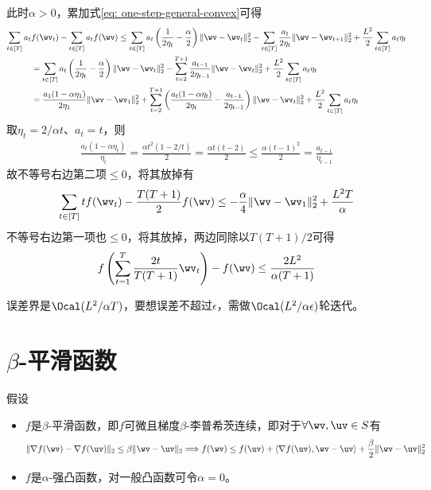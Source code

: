 \documentclass{ctexart}
\begin{document}
此时$\alpha > 0$，累加式\eqref{eq: one-step-general-convex}可得
\begin{align*}
    \sum_{t \in [T]} a_t
     & f(\wv_t) - \sum_{t \in [T]} a_t f(\wv) \le \sum_{t \in [T]} a_t \left( \frac{1}{2\eta_t} - \frac{\alpha}{2} \right) \| \wv - \wv_t \|_2^2 - \sum_{t \in [T]} \frac{a_t}{2\eta_t} \| \wv - \wv_{t+1} \|_2^2 + \frac{L^2}{2} \sum_{t \in [T]} a_t \eta_t \\
     & = \sum_{t \in [T]} a_t \left( \frac{1}{2\eta_t} - \frac{\alpha}{2} \right) \| \wv - \wv_t \|_2^2 - \sum_{t=2}^{T+1} \frac{a_{t-1}}{2\eta_{t-1}} \| \wv - \wv_t \|_2^2 + \frac{L^2}{2} \sum_{t \in [T]} a_t \eta_t                                      \\
     & = \frac{a_1(1 - \alpha \eta_1)}{2 \eta_1} \| \wv - \wv_1 \|_2^2 + \sum_{t=2}^{T+1} \left( \frac{a_t (1 - \alpha \eta_t)}{2 \eta_t} - \frac{a_{t-1}}{2\eta_{t-1}} \right) \| \wv - \wv_t \|_2^2 + \frac{L^2}{2} \sum_{t \in [T]} a_t \eta_t
\end{align*}
取$\eta_t = 2/\alpha t$、$a_t = t$，则
\begin{align*}
    \frac{a_t (1 - \alpha \eta_t)}{\eta_t} = \frac{\alpha t^2 (1 - 2/t)}{2} = \frac{\alpha t (t - 2)}{2} \le \frac{\alpha (t - 1)^2}{2} = \frac{a_{t-1}}{\eta_{t-1}}
\end{align*}
故不等号右边第二项$\le 0$，将其放掉有
\begin{align*}
    \sum_{t \in [T]} t f(\wv_t) - \frac{T(T+1)}{2} f(\wv) \le - \frac{\alpha}{4} \| \wv - \wv_1 \|_2^2 + \frac{L^2 T}{\alpha}
\end{align*}
不等号右边第一项也$\le 0$，将其放掉，两边同除以$T(T+1)/2$可得
\begin{align*}
    f \left( \sum_{t=1}^T \frac{2t}{T(T+1)} \wv_t \right) - f(\wv) \le \frac{2 L^2}{\alpha (T+1)}
\end{align*}

\begin{remark}
    误差界是$\Ocal(L^2/\alpha T)$，要想误差不超过$\epsilon$，需做$\Ocal(L^2/\alpha \epsilon)$轮迭代。
\end{remark}

\section{$\beta$-平滑函数}

假设
\begin{itemize}
    \item $f$是$\beta$-平滑函数，即$f$可微且梯度$\beta$-李普希茨连续，即对于$\forall \wv, \uv \in S$有
          \begin{align*}
              \| \nabla f(\wv) - \nabla f(\uv) \|_2 \le \beta \| \wv - \uv \|_2 \Longrightarrow f(\wv) \le f(\uv) + \langle \nabla f(\uv), \wv - \uv \rangle + \frac{\beta}{2} \| \wv - \uv \|_2^2
          \end{align*}
    \item $f$是$\alpha$-强凸函数，对一般凸函数可令$\alpha = 0$。
\end{itemize}
\end{document}
